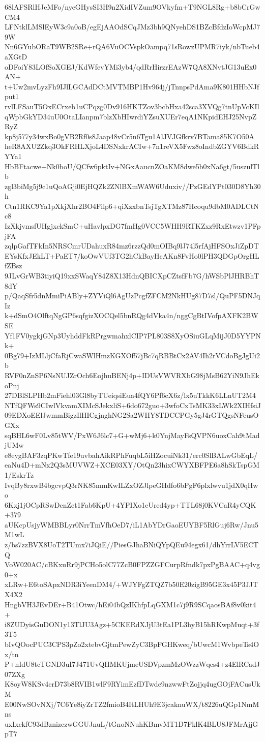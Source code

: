 68lAFSRlHJeMFo/nyeGHysSI3H9n2XidIVZum9OVkyfm+T9NGL8Rg+b8bCrGwCM4
LFNtklLMSlEyW3c9a0oB/egEjAAOdSCqJMz3bh9QNyehDS1BZcBfdzIoWcpMJ79W
Nn6GYubORaT9WB2SRe+rQA6VuOCVspkOampq71sRowzUPMR7iyk/nbTueb4aXGtD
oDFoiY83LOfSoXGEJ/KdWfevYMi3yb4/qdRrHirzrEAzW7QA8XNvtJG13uEx0AN+
t+Uw2mvLyzFh9IJlLGCAdDCtMVTMBP1Hv964j/jTnnpsPdAma9K801HHbNJfput1
rvlLFSauT5OxECrxeb1uCPqzg0Dv916HKTZov3bcbHxa42sca3XVQg7tnUpVcKIl
qWpbGkYD34uU0OtaLIanpm7blzXbHIwrdiYZsuXUEr7eqA1NKpidEHJ25NvpZRyZ
kp8j577y34wxBo0gVB2Rf0s8Jaap48vCr5n6Tgu1AlJVJGfkrv7BTama85K7O50A
heR8AXU2Zkq3OkFRHLXjoL4DSNxkrACIw+7n1reVX5Fwz8oIndbZGYV6BdkRYYa1
HbBFtacwe+Nk0boU/QCfw6pktIv+NGxAaucnZOaKM8dwe5b0xNa6gt/5uszulTlb
zgl3biMg5j9c1uQoAGji0EjHQZk2ZNlBXmWAW6Uduxiv//PzGEdYPt030D8Yh30h
Ctn1RKC9Ya1pXkjXhr2BO4Filp6+qiXzxbnTsjTgXTMz87Hcoqu9dbM0ADLCtNc8
IzXkjvmsfUHgjxckSmC+uHavlpxDG7fmHg0VCC5WHH9RTKZxz9RxEtwzv1PFpjFA
zqlpGafTFkIn5NRSCmrUDahuxR84mz6rzzQd0mOIBq9lJ74l5rfAjHFSOxJiZpDT
EYsKfxJEkLT+PaET7/koOwVUf3TG2hCkBayHcAKn8FvHo0lPH3QDGpOrgHLfZBsz
9JLvGrWB3tiyiQ19xxSWaqY84Z8X13HdnQBICXpCZtsfFb7G/hWSbPlJHRBhT8dY
p/QaqSfr5dnMmiPiABly+ZYViQl6AgUzPcgfZFCM2NkHUg87D7sl/QuPF5DNJqIz
k+dSmO4OlftqNgGP6sqfgizXOCQel5bnRQg4dVka4n/nggCgBtIVofpAXFK2BWSE
Yf1FV0ygkjGNp3UyhddFkRPrgwmahxlCIP7PL803S8XyOSiuGLqMijJ0D5YYPNk+
0Bg79+IzMLljCfaRjCwaSWlHmzKGXOf57jBc7qRBBtCx2AV4Ih2rVCdoBgJgUi2b
RVF0nZnSP6NsNUJZrOch6EojhuBENj4p+IDUsVWVRXbG98jMsB62YiN9JhEkoPnj
27DBlSLPHb2mFiehl03Gl8byTUeiqsiEua4fQY6Pf6cX6z/lx5uTkkK6LLnUT2M4
NTfQFWs9CIwlVkvamXIMcSJekxliS+6do672guo+3wfoCxTsMK33xLWk2XIHfsiJ
09EDXoEElJwmmBigzIlHICgjnghNG2Sa2WIIY8TDCCPGy5gJ4rGTQgsNFeusOGXx
sqBHL6wF0Lv85tWV/PxW6J6lc7+G+wMj6+k0YnjMayFsQVPN6uoxCah9tMadjUMw
e8eygBAF3zqPKwTfe19uvbahAikRPhFuqbL5iHZocuiNk31/erc0SlBALwGbEqL/
eaNu4D+mNx2Q3sMUVWZ+XCE03XY/OtQn23hixCWYXBFPE6a8hSkTspGM1/EskrTz
IvqBy8rxwB4bgcvpQ3rNK85mmKwILZxOZJlpeGHdfo6bPgF6plxlwvu1jdX0qHwo
6Kxj1jOCpRSwDenZet1Fab6KpU+4YPIXo1eUred4yp+TTL68j0KVCaR4yCQK+379
aUKcpUsjyWMBBLyr0NrrTmVfhOeD7/iL1AbYDrGaoEUYBF5RlGuj6Rw/Jnu5M1wL
z/bs7zzBVX8UoT2TUmx7iJQiE//PiesGJhaBNiQYpQEu94egx61/dhYrrLV5ECTQ
VoW020AC/cBKxuRr9jPCHo5olC77ZcB0FPZZGFCurpRfndk7pxPgBAAC+q4vg0+x
xLRw+E6toSApxNDR3iYeenDM4/+WJYFgZTQZ7b50E20zigB95GE3x45P3JJTX4X2
HngbVH3JEvDEr+B41Otwc/hEi04bQzIKhfpLqGXM1c7j9R9SCqaosBAf8v0kit4+
i8ZUDyisGuDON1y13TlJU3Agz+5CKERdXJjU3tEa1PL3hyB15hRKwpMuqt+3f3T5
bIvQOocPUC3CPS3pZo2xtebvGjtmPewZyC3BpFGHKweq/bUwcM1WvbpeTs4Ox/tn
P+nIdU8tcTGND3uI7J471UvQHMKUjmeUSDVpzmMzOWzzWqcs4+z4ElRCadJ07ZXg
K8oyW8KSv4crD73b8RVIB1wlF9RYimEzfDTwde9nzwwFtZojjq4ugGOjFACusUkM
E00NwSOvNXj/7C6Ye8iyZrTZ2fmioB4ItLHUh9E3jcaknuWX/t8226uQGp1NmMns
uxIxckfC93dBznizczwGGUJnuL/tGnoNNuhKBmvMT1D7FklK4BLU8JFMrAjjGpT7
